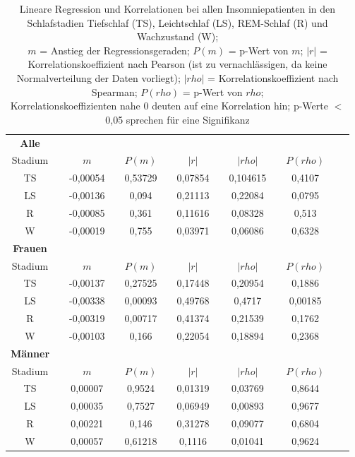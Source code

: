 


\begin{table}[H] 
\centering
\begin{tabularx}{0.85\textwidth}{ccccccccccccc}
\toprule
\textbf{Alle} & & & & & & & & & & & &\\  
\cmidrule{1-1}
Stadium & & $m$ & & $P(m)$ & & $|r|$ & & $|rho|$ & & $P(rho)$\\
\midrule
TS & & -0,00054 & & 0,53729 & & 0,07854 & & 0,104615 & & 0,4107\\
LS & & -0,00136 & & 0,094 & & 0,21113 & & 0,22084 & & 0,0795\\
R & & -0,00085 & & 0,361 & & 0,11616 & & 0,08328 & & 0,513\\
W & & -0,00019 & & 0,755 & & 0,03971 & & 0,06086 & & 0,6328\\
\midrule
\textbf{Frauen} & & & & & & & & & & & &\\  
\cmidrule{1-1}
Stadium & & $m$ & & $P(m)$ & & $|r|$ & & $|rho|$ & & $P(rho)$\\
\midrule
TS & & -0,00137 & & 0,27525 & & 0,17448 & & 0,20954 & & 0,1886\\
LS & & -0,00338 & & 0,00093 & & 0,49768 & & 0,4717 & & 0,00185\\
R & & -0,00319 & & 0,00717  & & 0,41374 & & 0,21539 & & 0,1762\\
W & & -0,00103 & & 0,166 & & 0,22054 & & 0,18894 & & 0,2368\\
\midrule
\textbf{Männer} & & & & & & & & & & & &\\  
\cmidrule{1-1}
Stadium & & $m$ & & $P(m)$ & & $|r|$ & & $|rho|$ & & $P(rho)$\\
\midrule
TS & & 0,00007 & & 0,9524 & & 0,01319 & & 0,03769 & & 0,8644\\
LS & & 0,00035 & & 0,7527 & & 0,06949 & & 0,00893 & & 0,9677\\
R & & 0,00221 & & 0,146 & & 0,31278 & & 0,09077 & & 0,6804\\
W & & 0,00057 & & 0,61218 & & 0,1116 & & 0,01041 & & 0,9624\\
\bottomrule
\end{tabularx}
\caption[Lineare Regression und Korrelationen bei allen Insomniepatienten]{Lineare Regression und Korrelationen bei allen Insomniepatienten in den Schlafstadien Tiefschlaf (TS), Leichtschlaf (LS), \acs{REM}-Schlaf (R) und Wachzustand (W);\\
$m$ = Anstieg der Regressionsgeraden; $P(m)$ = p-Wert von $m$; $|r|$ = Korrelationskoeffizient nach Pearson (ist zu vernachlässigen, da keine Normalverteilung der Daten vorliegt); $|rho|$ = Korrelationskoeffizient nach Spearman; $P(rho)$ = p-Wert von $rho$;\\Korrelationskoeffizienten nahe 0 deuten auf eine Korrelation hin; p-Werte $<$ 0,05 sprechen für eine Signifikanz}
\label{tab:linregAlle}
\end{table}



